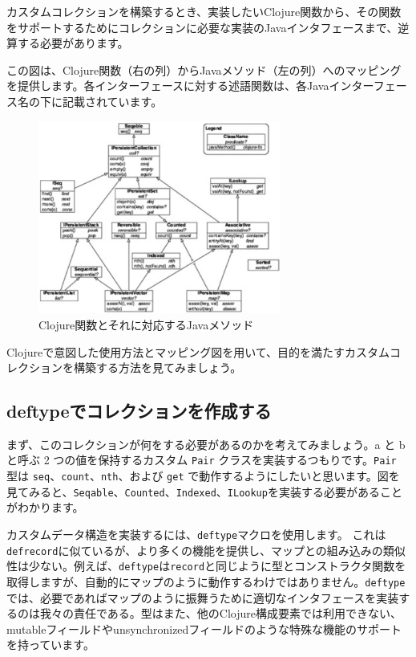 カスタムコレクションを構築するとき、実装したいClojure関数から、その関数をサポートするためにコレクションに必要な実装のJavaインタフェースまで、逆算する必要があります。

この図は、Clojure関数（右の列）からJavaメソッド（左の列）へのマッピングを提供します。各インターフェースに対する述語関数は、各Javaインターフェース名の下に記載されています。

\begin{figure}[h]
\centering
\includegraphics[width=8cm]{fig_02_002.eps}
\caption{Clojure関数とそれに対応するJavaメソッド}
\end{figure}

Clojureで意図した使用方法とマッピング図を用いて、目的を満たすカスタムコレクションを構築する方法を見てみましょう。

\subsection{deftypeでコレクションを作成する}

まず、このコレクションが何をする必要があるのかを考えてみましょう。a と b と呼ぶ 2 つの値を保持するカスタム \texttt{Pair} クラスを実装するつもりです。\texttt{Pair} 型は \texttt{seq}、\texttt{count}、\texttt{nth}、および \texttt{get} で動作するようにしたいと思います。図を見てみると、\texttt{Seqable}、\texttt{Counted}、\texttt{Indexed}、\texttt{ILookup}を実装する必要があることがわかります。

カスタムデータ構造を実装するには、\texttt{deftype}マクロを使用します。
これは\texttt{defrecord}に似ているが、より多くの機能を提供し、マップとの組み込みの類似性は少ない。例えば、\texttt{deftype}は\texttt{record}と同じように型とコンストラクタ関数を取得しますが、自動的にマップのように動作するわけではありません。\texttt{deftype}では、必要であればマップのように振舞うために適切なインタフェースを実装するのは我々の責任である。型はまた、他のClojure構成要素では利用できない、mutableフィールドやunsynchronizedフィールドのような特殊な機能のサポートを持っています。

